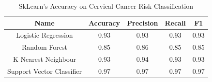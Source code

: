 \documentclass[12pt]{report}
\begin{document}



\begin{table}
    \caption{SkLearn's Accuracy on Cervical Cancer Risk Classification}
    \label{tab:SkLearn's Accuracy on Cervical Cancer Risk}
    
    \begin{center}
    \begin{tabular}{|c|c|c|c|c|}
    \hline
    \textbf{Name} & \textbf{Accuracy} & \textbf{Precision} & \textbf{Recall} & \textbf{F1} \\ \hline
    Logistic Regression  & 0.93 & 0.93 & 0.93 & 0.93 \\ \hline
    Random Forest & 0.85 & 0.86 & 0.85 & 0.85 \\ \hline
    K Nearest Neighbour & 0.93 & 0.94 & 0.93 & 0.93 \\ \hline
    Support Vector Classifier & 0.97 & 0.97 & 0.97 & 0.97 \\ \hline
    
    \end{tabular}
    \end{center}
\end{table}



\end{document}
